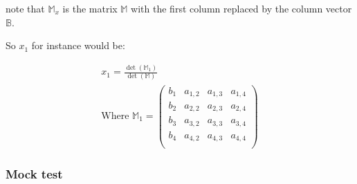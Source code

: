 \documentclass{article}
\begin{document}
note that $\mathbb{M}_x$ is the matrix $\mathbb{M}$ with the first column replaced by the column vector $\mathbb{B}$.

So $ x_1 $ for instance would be:

\begin{align}
    x_1 = \frac{\det(\mathbb{M}_1)}{\det(\mathbb{M})} \\
    \textrm{Where } \mathbb{M}_1 =
    \begin{pmatrix}
        b_1 & a_{1,2} & a_{1,3} & a_{1,4} \\
        b_2 & a_{2,2} & a_{2,3} & a_{2,4} \\
        b_3 & a_{3,2} & a_{3,3} & a_{3,4} \\
        b_4 & a_{4,2} & a_{4,3} & a_{4,4} \\
    \end{pmatrix}
\end{align}

\subsubsection{Mock test}
\end{document}
